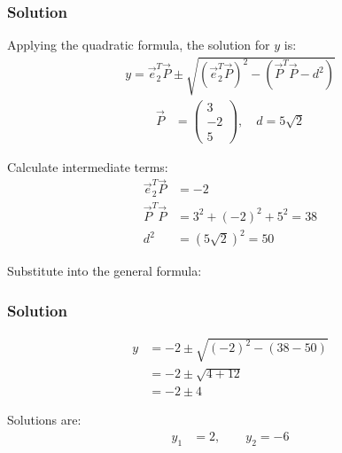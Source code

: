 \documentclass{beamer}
\theoremstyle{remark}
\numberwithin{equation}{section}
\numberwithin{equation}{section}
\begin{document}
\begin{frame}
\frametitle{Solution}
Applying the quadratic formula, the solution for \( y \) is:
\begin{align}
y = \vec{e}_2^T \vec{P} \pm \sqrt{\left(\vec{e}_2^T \vec{P}\right)^2 - \left(\vec{P}^T \vec{P} - d^2\right)}
\end{align}
\begin{align}
\vec{P} &= \begin{pmatrix}3 \\ -2 \\ 5\end{pmatrix}, \quad d = 5\sqrt{2}
\end{align}

Calculate intermediate terms:
\begin{align}
\vec{e}_2^T \vec{P} &= -2 \\
\vec{P}^T \vec{P} &= 3^2 + (-2)^2 + 5^2 = 38 \\
d^2 &= (5\sqrt{2})^2 = 50
\end{align}

Substitute into the general formula:

\end{frame}
\begin{frame}
\frametitle{Solution}
\begin{align}
y &= -2 \pm \sqrt{(-2)^2 - (38 - 50)} \\
  &= -2 \pm \sqrt{4 + 12} \\
  &= -2 \pm 4
\end{align}

Solutions are:
\begin{align}
y_1 &= 2, \qquad y_2 = -6
\end{align}
\end{frame}
\end{document}
